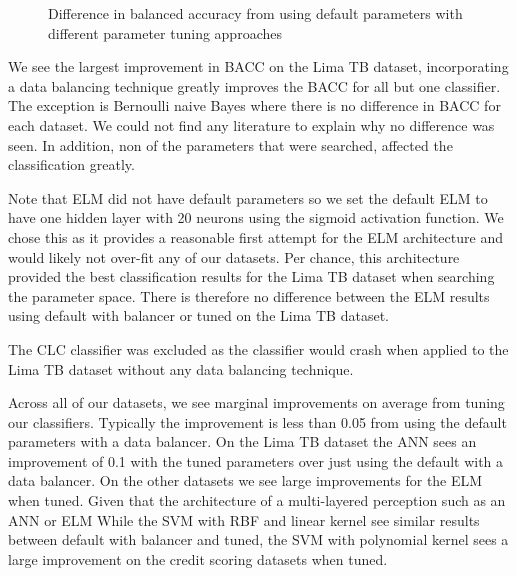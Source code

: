 \documentclass{sig-alternate-05-2015}
\begin{document}
	\begin{figure}
		\centering
		\caption{Difference in balanced accuracy from using default parameters with different parameter tuning approaches}
		\label{fig:parameter_tuning}
	\end{figure}
	
	We see the largest improvement in BACC on the Lima TB dataset, incorporating a data balancing technique greatly improves the BACC for all but one classifier. The exception is Bernoulli naive Bayes where there is no difference in BACC for each dataset. We could not find any literature to explain why no difference was seen. In addition, non of the parameters that were searched, affected the classification greatly.
	
	Note that ELM did not have default parameters so we set the default ELM to have one hidden layer with 20 neurons using the sigmoid activation function. We chose this as it provides a reasonable first attempt for the ELM architecture and would likely not over-fit any of our datasets. Per chance, this architecture provided the best classification results for the Lima TB dataset when searching the parameter space. There is therefore no difference between the ELM results using default with balancer or tuned on the Lima TB dataset.
	
	The CLC classifier was excluded as the classifier would crash when applied to the Lima TB dataset without any data balancing technique.
	
	Across all of our datasets, we see marginal improvements on average from tuning our classifiers. Typically the improvement is less than 0.05 from using the default parameters with a data balancer. On the Lima TB dataset the ANN sees an improvement of 0.1 with the tuned parameters over just using the default with a data balancer. On the other datasets we see large improvements for the ELM when tuned. Given that the architecture of a multi-layered perception such as an ANN or ELM  While the SVM with RBF and linear kernel see similar results between default with balancer and tuned, the SVM with polynomial kernel sees a large improvement on the credit scoring datasets when tuned.
	
\end{document}
